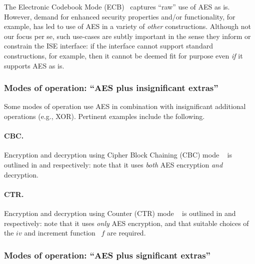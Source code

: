 
The
Electronic Codebook Mode (ECB)~\cite[Section 6.1]{NIST:sp.800.38a}
captures ``raw'' use of AES as is.  However, demand for enhanced security
properties and/or functionality, for example, has led to use of AES in a
variety of {\em other} constructions.
Although not our focus per se, such use-cases are subtly important in the 
sense they inform or constrain the ISE interface: if the interface cannot 
support standard constructions, for example, then it cannot be deemed fit 
for purpose even {\em if} it supports AES as is.


\subsubsection{Modes of operation: ``AES plus insignificant extras''}

Some modes of operation use AES in combination with
insignificant 
additional operations
(e.g., XOR).
Pertinent examples include the following.

\paragraph{CBC.}

Encryption
and 
decryption
using
Cipher Block Chaining (CBC) mode
~\cite[Section 6.2]{NIST:sp.800.38a}
is outlined in
and
respectively:
note that it uses {\em both} AES encryption {\em and} decryption.

\paragraph{CTR.}

Encryption
and 
decryption
using
Counter               (CTR) mode
~\cite[Section 6.5]{NIST:sp.800.38a}
is outlined in
and
respectively:
note that it uses {\em only} AES encryption, and that suitable choices of 
the $iv$ and increment function~\cite[Appendix B]{NIST:sp.800.38a} $f$ are
required.


\subsubsection{Modes of operation: ``AES plus   significant extras''}

